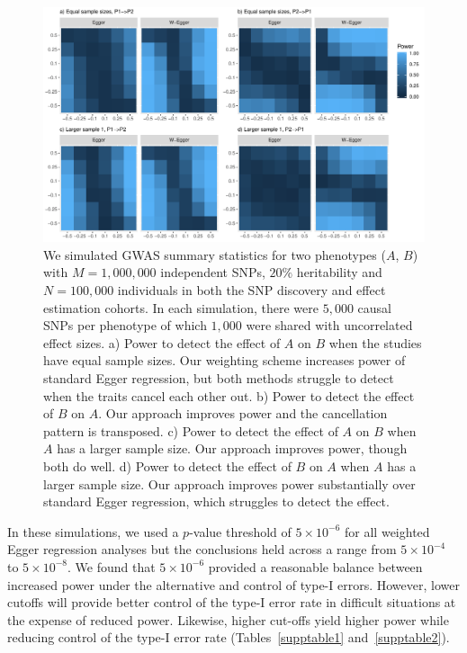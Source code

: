\documentclass{article}
\begin{document}
\begin{figure}\label{figure2}
\includegraphics[width=\textwidth]{figures/figure2.pdf}
\caption{ We simulated GWAS summary statistics for two phenotypes ($A$, $B$) with $M=1,000,000$
independent SNPs, $20\%$ heritability and $N = 100,000$ individuals in both
 the SNP discovery and effect estimation cohorts. In each simulation, there
 were $5,000$ causal SNPs per phenotype of which $1,000$ were shared with uncorrelated
 effect sizes. a) Power to detect the effect of $A$ on $B$ when the studies have equal
 sample sizes. Our weighting scheme increases power of standard Egger regression, but both
 methods struggle to detect when the traits cancel each other out. b) Power to detect the
 effect of $B$ on $A$. Our approach improves power and the cancellation pattern is transposed.
 c) Power to detect the effect of $A$ on $B$ when $A$ has a larger sample size. Our approach
 improves power, though both do well. d) Power to detect the effect of $B$ on $A$ when
  $A$ has a larger sample size. Our approach improves power substantially over standard
  Egger regression, which struggles to detect the effect.}
\end{figure}



In these simulations, we used a $p$-value threshold of $5\times 10^{-6}$
for all weighted Egger regression analyses but the conclusions held across a range from $5\times 10^{-4}$ to $5\times 10^{-8}$. We found that
$5\times 10^{-6}$ provided a reasonable balance between increased power under 
the alternative and control of type-I errors. However, lower
cutoffs will provide better control of the type-I error rate in difficult situations
at the expense of reduced power. Likewise, higher cut-offs yield higher power
while reducing control of the type-I error rate
(Tables~\ref{supptable1} and~\ref{supptable2}). 
\end{document}
